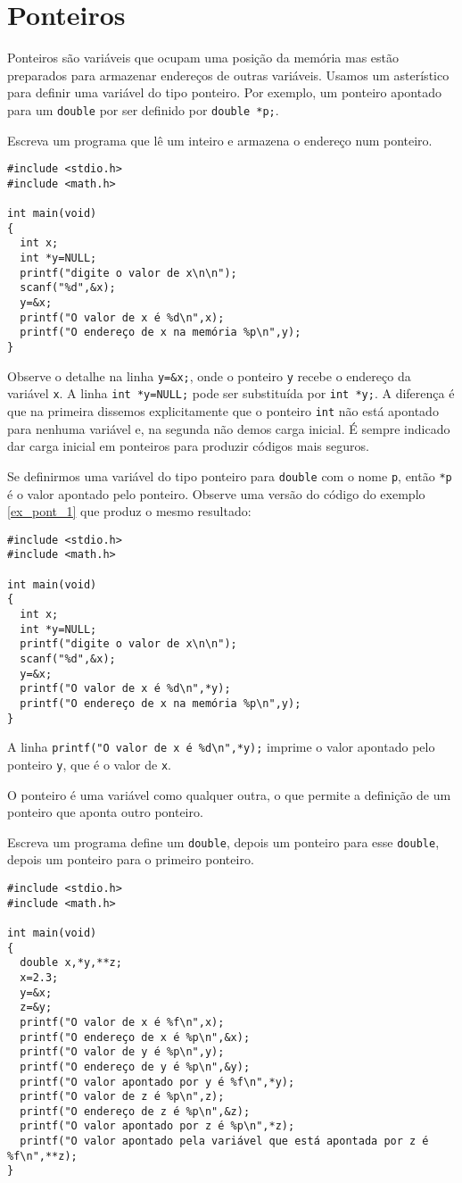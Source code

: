 \section{Ponteiros}
Ponteiros são variáveis que ocupam uma posição da memória mas estão preparados para armazenar endereços de outras variáveis. Usamos um asterístico para definir uma variável do tipo ponteiro. Por exemplo, um ponteiro apontado para um \verb|double| por ser definido por \verb|double *p;|. 
\begin{ex}\label{ex_pont_1}
Escreva um programa que lê um inteiro e armazena o endereço num ponteiro. 
\end{ex}
\begin{verbatim}
#include <stdio.h>
#include <math.h>

int main(void)
{
  int x;
  int *y=NULL;
  printf("digite o valor de x\n\n");
  scanf("%d",&x);
  y=&x;
  printf("O valor de x é %d\n",x);
  printf("O endereço de x na memória %p\n",y);
}
\end{verbatim}
Observe o detalhe na linha \verb|y=&x;|, onde o ponteiro \verb|y| recebe o endereço da variável \verb|x|. A linha \verb|int *y=NULL;| pode ser substituída por \verb|int *y;|. A diferença é que na primeira dissemos explicitamente que o ponteiro \verb|int| não está apontado para nenhuma variável e, na segunda não demos carga inicial. É sempre indicado dar carga inicial em ponteiros para produzir códigos mais seguros. 

Se definirmos uma variável do tipo ponteiro para \verb|double| com o nome \verb|p|, então \verb|*p| é o valor apontado pelo ponteiro. Observe uma versão do código do exemplo \ref{ex_pont_1} que produz o mesmo resultado:
\begin{verbatim}
#include <stdio.h>
#include <math.h>

int main(void)
{
  int x;
  int *y=NULL;
  printf("digite o valor de x\n\n");
  scanf("%d",&x);
  y=&x;
  printf("O valor de x é %d\n",*y);
  printf("O endereço de x na memória %p\n",y);
}
\end{verbatim}
A linha \verb|printf("O valor de x é %d\n",*y);| imprime o valor apontado pelo ponteiro \verb|y|, que é o valor de \verb|x|.

O ponteiro é uma variável como qualquer outra, o que permite a definição de um ponteiro que aponta outro ponteiro.
\begin{ex}
Escreva um programa define um \verb|double|, depois um ponteiro para esse \verb|double|, depois um ponteiro para o primeiro ponteiro. 
\end{ex}
\begin{verbatim}
#include <stdio.h>
#include <math.h>

int main(void)
{
  double x,*y,**z;
  x=2.3;
  y=&x;
  z=&y;
  printf("O valor de x é %f\n",x);
  printf("O endereço de x é %p\n",&x);
  printf("O valor de y é %p\n",y);
  printf("O endereço de y é %p\n",&y);
  printf("O valor apontado por y é %f\n",*y);
  printf("O valor de z é %p\n",z);
  printf("O endereço de z é %p\n",&z);
  printf("O valor apontado por z é %p\n",*z);
  printf("O valor apontado pela variável que está apontada por z é %f\n",**z);
}
\end{verbatim}

